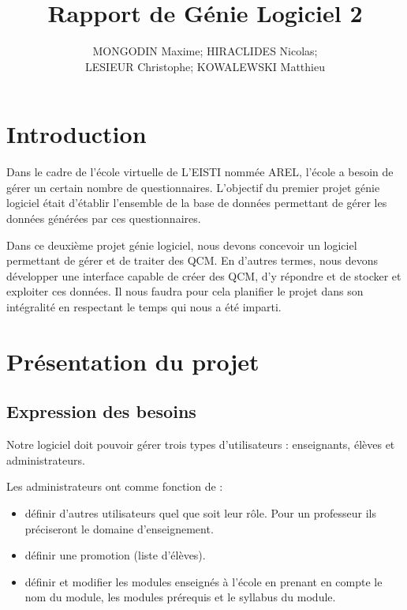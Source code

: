 \documentclass[10pt,a4paper,titlepage]{report}
\author{MONGODIN Maxime; HIRACLIDES Nicolas;\\
 LESIEUR Christophe; KOWALEWSKI Matthieu}
\title{Rapport de Génie Logiciel 2}
\begin{document}
\maketitle
\tableofcontents
\newpage
\chapter*{Introduction}
Dans le cadre de l'école virtuelle de L'EISTI nommée AREL, l'école a besoin de gérer un certain nombre de questionnaires. L'objectif du premier projet génie logiciel était d'établir l'ensemble de la base de données permettant de gérer les données générées par ces questionnaires.


Dans ce deuxième projet génie logiciel, nous devons concevoir un logiciel permettant de gérer et de traiter des QCM. En d’autres termes, nous devons développer une interface capable de créer des QCM, d’y répondre et de stocker et exploiter ces données.
Il nous faudra pour cela planifier le projet dans son intégralité en respectant le temps qui nous a été imparti.

\newpage
\chapter{Présentation du projet}

	\section{Expression des besoins}
		Notre logiciel doit pouvoir gérer trois types d’utilisateurs : enseignants, élèves et administrateurs.
		
		
		Les administrateurs  ont comme fonction de  :
		\begin{itemize}
			\item définir d’autres utilisateurs quel que soit leur rôle. Pour un professeur ils préciseront le domaine d’enseignement.

			\item définir une promotion (liste d’élèves).

			\item définir et modifier les modules enseignés à l’école en prenant en compte le nom du module, les modules prérequis et le syllabus du module.
		\end{itemize}
		
		
\end{document}
